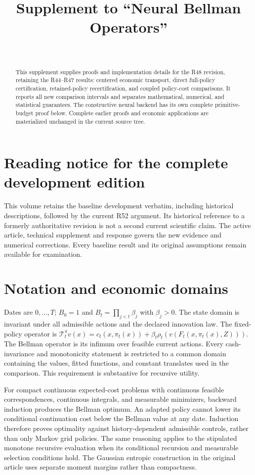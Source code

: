 \documentclass[ecta,nameyear,draft]{econsocart}
\begin{document}
\begin{frontmatter}
\title{Supplement to ``Neural Bellman Operators''}
\begin{aug}
\author[id=au1,addressref={add1}]{~}
\address[id=add1]{Peking University}
\end{aug}
\begin{abstract}
This supplement supplies proofs and implementation details for the R48 revision, retaining the R44--R47 results: centered economic transport, direct full-policy certification, retained-policy recertification, and coupled policy-cost comparisons. It reports all new comparison intervals and separates mathematical, numerical, and statistical guarantees. The constructive neural backend has its own complete primitive-budget proof below. Complete earlier proofs and economic applications are materialized unchanged in the current source tree.
\end{abstract}
\end{frontmatter}
\section*{Reading notice for the complete development edition}
This volume retains the baseline development verbatim, including historical descriptions, followed by the current R52 argument. Its historical reference to a formerly authoritative revision is not a second current scientific claim. The active article, technical supplement and response govern the new evidence and numerical corrections. Every baseline result and its original assumptions remain available for examination.

\section{Notation and economic domains}
Dates are $0,\ldots,T$; $B_0=1$ and $B_t=\prod_{j<t}\beta_j$ with $\beta_j>0$. The state domain is invariant under all admissible actions and the declared innovation law. The fixed-policy operator is
$\mathcal T_t^\pi v(x)=c_t(x,\pi_t(x))+\beta_t\rho_t(v(F_t(x,\pi_t(x),Z)))$.
The Bellman operator is its infimum over feasible current actions. Every cash-invariance and monotonicity statement is restricted to a common domain containing the values, fitted functions, and constant translates used in the comparison. This requirement is substantive for recursive utility.

For compact continuous expected-cost problems with continuous feasible correspondences, continuous integrals, and measurable minimizers, backward induction produces the Bellman optimum. An adapted policy cannot lower its conditional continuation cost below the Bellman value at any date. Induction therefore proves optimality against history-dependent admissible controls, rather than only Markov grid policies. The same reasoning applies to the stipulated monotone recursive evaluation when its conditional recursion and measurable selection conditions hold. The Gaussian entropic construction in the original article uses separate moment margins rather than compactness.
\end{document}
